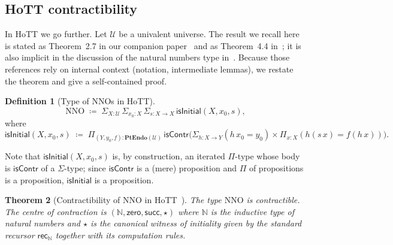 \documentclass[12pt]{article}
\newtheorem{theorem}{Theorem}[section]
\theoremstyle{definition}
\newtheorem{definition}[theorem]{Definition}
\theoremstyle{remark}
\newcommand{\N}{\mathbb{N}}
\newcommand{\zero}{\mathsf{zero}}
\newcommand{\suc}{\mathsf{succ}}
\newcommand{\PtEndo}{\mathbf{PtEndo}}
\newcommand{\NNO}{\mathrm{NNO}}
\newcommand{\U}{\mathcal{U}}
\newcommand{\isContr}{\mathsf{isContr}}
\newcommand{\rec}{\mathsf{rec}}
\newcommand{\Sigmatype}{\Sigma}
\newcommand{\Pitype}{\Pi}
\begin{document}
\subsection{HoTT contractibility}\label{sec:hott-contr}

In HoTT we go further. Let $\U$ be a univalent universe. The result we recall here is stated as Theorem~2.7 in our companion paper~\cite{PaperIII} and as Theorem~4.4 in~\cite{PaperV}; it is also implicit in the discussion of the natural numbers type in~\cite[Chapter 6]{HoTTBook}. Because those references rely on internal context (notation, intermediate lemmas), we restate the theorem and give a self-contained proof.

\begin{definition}[Type of NNOs in HoTT]\label{def:nno-type}
\[
\NNO \;\coloneqq\; \Sigmatype_{X:\U}\,\Sigmatype_{x_{0}:X}\,\Sigmatype_{s:X\to X}\,\mathsf{isInitial}(X,x_{0},s),
\]
where
\[
\mathsf{isInitial}(X,x_{0},s) \;\coloneqq\; \Pitype_{(Y,y_{0},f):\PtEndo(\U)}\,\isContr\!\bigl(\Sigmatype_{h:X\to Y}(h\,x_{0}=y_{0})\times\Pitype_{x:X}(h(s\,x)=f(h\,x))\bigr).
\]
\end{definition}

Note that $\mathsf{isInitial}(X,x_{0},s)$ is, by construction, an iterated $\Pitype$-type whose body is $\isContr$ of a $\Sigmatype$-type; since $\isContr$ is a (mere) proposition and $\Pitype$ of propositions is a proposition, $\mathsf{isInitial}$ is a proposition.

\begin{theorem}[Contractibility of $\NNO$ in HoTT~\cite{PaperIII,PaperV}]\label{thm:contr-hott}
The type $\NNO$ is contractible. The centre of contraction is $(\N,\zero,\suc,\star)$ where $\N$ is the inductive type of natural numbers and $\star$ is the canonical witness of initiality given by the standard recursor $\rec_{\N}$ together with its computation rules.
\end{theorem}
\end{document}
